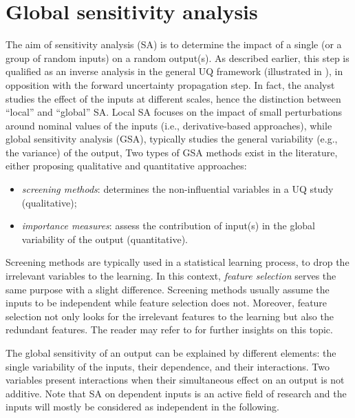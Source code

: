 \section{Global sensitivity analysis} \label{sec:gsa}

The aim of sensitivity analysis (SA) is to determine the impact of a single (or a group of random inputs) on a random output(s). 
As described earlier, this step is qualified as an inverse analysis in the general UQ framework (illustrated in ), in opposition with the forward uncertainty propagation step. 
In fact, the analyst studies the effect of the inputs at different scales, hence the distinction between ``local'' and ``global'' SA. 
Local SA focuses on the impact of small perturbations around nominal values of the inputs (i.e., derivative-based approaches), while
global sensitivity analysis (GSA), typically studies the general variability (e.g., the variance) of the output, 
Two types of GSA methods exist in the literature, either proposing qualitative and quantitative approaches:  
\begin{itemize}
    \item \textit{screening methods}: determines the non-influential variables in a UQ study (qualitative);
    \item \textit{importance measures}: assess the contribution of input(s) in the global variability of the output (quantitative).
\end{itemize}

Screening methods are typically used in a statistical learning process, to drop the irrelevant variables to the learning. 
In this context, \textit{feature selection} serves the same purpose with a slight difference. 
Screening methods usually assume the inputs to be independent while feature selection does not. 
Moreover, feature selection not only looks for the irrelevant features to the learning but also the redundant features.     
The reader may refer to  for further insights on this topic.

The global sensitivity of an output can be explained by different elements: the single variability of the inputs, their dependence, and their interactions. 
Two variables present interactions when their simultaneous effect on an output is not additive. 
Note that SA on dependent inputs is an active field of research and the inputs will mostly be considered as independent in the following.


